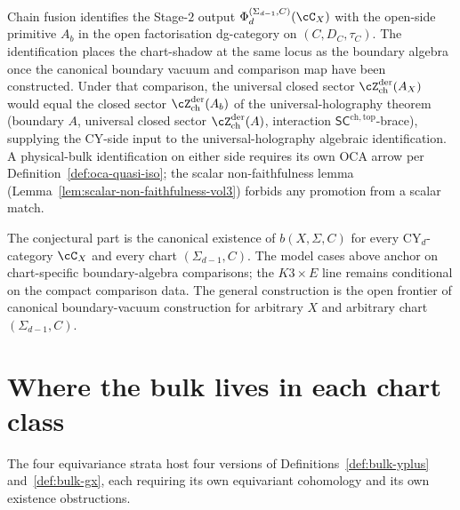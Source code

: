\begin{remark}
\label{rem:bulk-chain-fusion-bridges}
Chain fusion identifies the Stage-$2$ output
$\Phi^{(\Sigma_{d-1}, C)}_{d}(\cC_{X})$ with the open-side primitive
$A_{b}$ in the open factorisation dg-category on
$(C, D_{C}, \tau_{C})$. The identification places the
chart-shadow at the same locus as the boundary algebra once the
canonical boundary vacuum and comparison map have been constructed.
Under that comparison, the universal closed sector
$\cZ^{\mathrm{der}}_{\mathrm{ch}}(A_X)$ would equal the closed sector
$\cZ^{\mathrm{der}}_{\mathrm{ch}}(A_b)$
of the universal-holography theorem (boundary $A$, universal closed sector
$\cZ^{\mathrm{der}}_{\mathrm{ch}}(A)$, interaction
$\mathsf{SC}^{\mathrm{ch}, \mathrm{top}}$-brace), supplying the
CY-side input to the universal-holography algebraic identification.
A physical-bulk identification on either side requires its own OCA
arrow per Definition~\ref{def:oca-quasi-iso}; the scalar
non-faithfulness lemma (Lemma~\ref{lem:scalar-non-faithfulness-vol3})
forbids any promotion from a scalar match.
\end{remark}

\begin{remark}
\label{rem:bulk-chain-fusion-open}
The conjectural part is the canonical existence of $b(X, \Sigma, C)$
for every CY$_{d}$-category $\cC_{X}$ and every chart $(\Sigma_{d-1},
C)$. The model cases above anchor on chart-specific boundary-algebra
comparisons; the \(K3\times E\) line remains conditional on the compact
comparison data. The general construction is the open frontier of canonical
boundary-vacuum construction for arbitrary $X$ and arbitrary chart
$(\Sigma_{d-1}, C)$.
\end{remark}

\section{Where the bulk lives in each chart class}
\label{sec:bulk-by-chart-class}

The four equivariance strata host four versions of
Definitions~\ref{def:bulk-yplus} and~\ref{def:bulk-gx}, each requiring
its own equivariant cohomology and its own existence obstructions.

